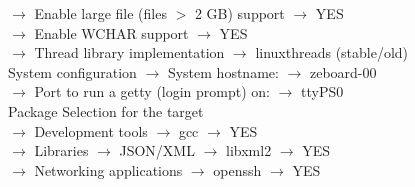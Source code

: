 \documentclass[openany,a4paper]{book}
\begin{document}
\begin{tabbing}
\>                                    \> $\rightarrow$ Enable large file (files $>$ 2 GB) support    \>                                                          \>                                                          \> $\rightarrow$ YES \\
\>                                    \> $\rightarrow$ Enable WCHAR support                          \>                                                          \>                                                          \> $\rightarrow$ YES \\
\>                                    \> $\rightarrow$ Thread library implementation                 \>                                                          \>                                                          \> $\rightarrow$ linuxthreads (stable/old) \\
\> System configuration               \>                                                             \> $\rightarrow$ System hostname:                           \>                                                          \> $\rightarrow$ zeboard-00 \\
\>                                    \>                                                             \> $\rightarrow$ Port to run a getty (login prompt) on:     \>                                                          \> $\rightarrow$ ttyPS0 \\
\> Package Selection for the target \\
\>                                    \> $\rightarrow$ Development tools                             \>                                                          \> $\rightarrow$ gcc                                        \> $\rightarrow$ YES \\
\>                                    \> $\rightarrow$ Libraries                                     \> $\rightarrow$ JSON/XML                                   \> $\rightarrow$ libxml2                                    \> $\rightarrow$ YES \\
\>                                    \> $\rightarrow$ Networking applications                       \>                                                          \> $\rightarrow$ openssh                                    \> $\rightarrow$ YES \\

\end{tabbing}
\end{document}
